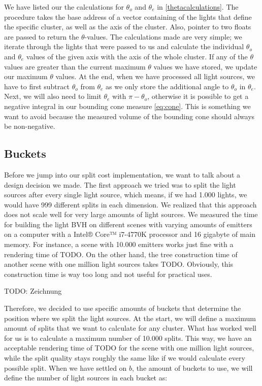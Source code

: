We have listed our the calculations for $\theta_o$ and $\theta_e$ in \ref{thetacalculations}. The procedure takes the base address of a vector containing of the lights that define the specific cluster, as well as the axis of the cluster. Also, pointer to two floats are passed to return the $\theta$-values. The calculations made are very simple; we iterate through the lights that were passed to us and calculate the individual $\theta_o$ and $\theta_e$ values of the given axis with the axis of the whole cluster. If any of the $\theta$ values are greater than the current maximum $\theta$ values we have stored, we update our maximum $\theta$ values. At the end, when we have processed all light sources, we have to first subtract $\theta_o$ from $\theta_e$ as we only store the additional angle to $\theta_o$ in $\theta_e$. Next, we will also need to limit $\theta_e$ with $\pi - \theta_o$, otherwise it is possible to get a negative integral in our bounding cone measure \ref{eq:cone}. This is something we want to avoid because the measured volume of the bounding cone should always be non-negative.

\subsection{Buckets}
\label{subs:buckets}

Before we jump into our split cost implementation, we want to talk about a design decision we made. The first approach we tried was to split the light sources after every single light source, which means, if we had 1.000 lights, we would have 999 different splits in each dimension. We realized that this approach does not scale well for very large amounts of light sources. We measured the time for building the light BVH on different scenes with varying amounts of emitters on a computer with a Intel® Core™ i7-4770K processor and 16 gigabyte of main memory. For instance, a scene with 10.000 emitters works just fine with a rendering time of TODO. On the other hand, the tree construction time of another scene with one million light sources takes TODO. Obviously, this construction time is way too long and not useful for practical uses. 

TODO: Zeichnung 

Therefore, we decided to use specific amounts of buckets that determine the position where we split the light sources. At the start, we will define a maximum amount of splits that we want to calculate for any cluster. What has worked well for us is to calculate a maximum number of 10.000 splits. This way, we have an acceptable rendering time of TODO for the scene with one million light sources, while the split quality stays roughly the same like if we would calculate every possible split. When we have settled on $b$, the amount of buckets to use, we will define the number of light sources in each bucket as:

